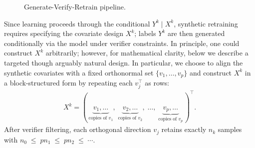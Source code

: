 \begin{figure}[h]
\centering
{}
\caption{Generate-Verify-Retrain pipeline.}
\label{fig:pipeline}
\end{figure}

Since learning proceeds through the conditional $Y^k \mid X^k$, synthetic retraining requires specifying the covariate design $X^k$; labels $Y^k$ are then generated conditionally via the model under verifier constraints.
In principle, one could construct $X^k$ arbitrarily; however, for mathematical clarity, below we describe a targeted though arguably natural design. 
In particular, we choose to align the synthetic covariates with a fixed orthonormal set $\{v_1,\dots,v_p\}$ and construct $X^k$ in a block-structured form by repeating each $v_j^\top$ as rows:
\label{equ:linear:block_design}
\begin{align}
X^k = (\,
\underbrace{v_1, \ldots}_{\text{copies of } v_1},\;
\underbrace{v_2, \ldots}_{\text{copies of } v_2},\;
\ldots,\;
\underbrace{v_p, \ldots}_{\text{copies of } v_p}
\,)^\top.
\end{align}
After verifier filtering, each orthogonal direction $v_j$ retains exactly $n_k$ samples with 
$
n_0 \;\leq\; pn_1 \;\leq\; pn_2 \;\leq\; \cdots.
$

